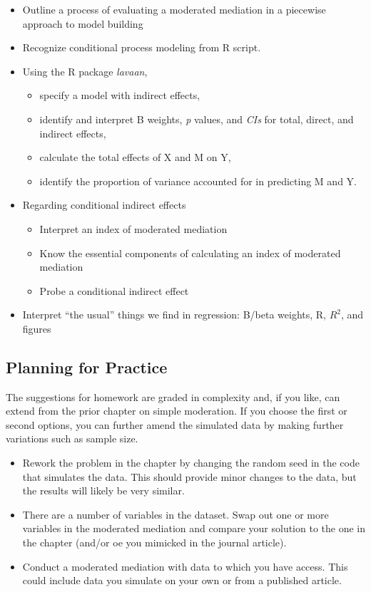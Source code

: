 \documentclass[
  11pt,
]{book}
\providecommand{\tightlist}{%
  \setlength{\itemsep}{0pt}\setlength{\parskip}{0pt}}
\begin{document}
\begin{itemize}
\tightlist
\item
  Outline a process of evaluating a moderated mediation in a piecewise \citep{hayes_introduction_2018} approach to model building
\item
  Recognize conditional process modeling from R script.
\item
  Using the R package \emph{lavaan},

  \begin{itemize}
  \tightlist
  \item
    specify a model with indirect effects,
  \item
    identify and interpret B weights, \emph{p} values, and \emph{CIs} for total, direct, and indirect effects,\\
  \item
    calculate the total effects of X and M on Y,
  \item
    identify the proportion of variance accounted for in predicting M and Y.
  \end{itemize}
\item
  Regarding conditional indirect effects

  \begin{itemize}
  \tightlist
  \item
    Interpret an index of moderated mediation
  \item
    Know the essential components of calculating an index of moderated mediation
  \item
    Probe a conditional indirect effect
  \end{itemize}
\item
  Interpret ``the usual'' things we find in regression: B/beta weights, R, \(R^{2}\), and figures
\end{itemize}

\hypertarget{planning-for-practice-7}{%
\subsection{Planning for Practice}\label{planning-for-practice-7}}

The suggestions for homework are graded in complexity and, if you like, can extend from the prior chapter on simple moderation. If you choose the first or second options, you can further amend the simulated data by making further variations such as sample size.

\begin{itemize}
\tightlist
\item
  Rework the problem in the chapter by changing the random seed in the code that simulates the data. This should provide minor changes to the data, but the results will likely be very similar.
\item
  There are a number of variables in the dataset. Swap out one or more variables in the moderated mediation and compare your solution to the one in the chapter (and/or oe you mimicked in the journal article).
\item
  Conduct a moderated mediation with data to which you have access. This could include data you simulate on your own or from a published article.
\end{itemize}
\end{document}
